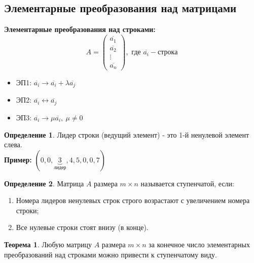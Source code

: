 \documentclass[a4paper, 12pt]{article}
\theoremstyle{definition}
\newtheorem*{definition}{Определение}
\newtheorem*{theorem}{Теорема}
\begin{document}
    \subsection{Элементарные преобразования над матрицами}
    \textbf{Элементарные преобразования над строками:} 
    $$A =\begin{pmatrix}
      \overline{a_1} \\
      \overline{a_2} \\
      \vdots \\
      \overline{a_n}
    \end{pmatrix}, \text{ где } \overline{a_i} - \text{строка}$$
    \begin{itemize}
      \item ЭП1: $\overline{a_i} \to \overline{a_i} + \lambda \overline{a_j}$
      \item ЭП2: $\overline{a_i} \longleftrightarrow   \overline{a_j}$
      \item ЭП3: $\overline{a_i} \to \mu \overline{a_i},\ \mu \neq 0$
  \end{itemize}
  \begin{definition}
    Лидер строки (ведущий элемент) - это 1-й ненулевой элемент слева. \\
    \textbf{Пример:} $(0, 0, \underbrace{3}_{\text{лидер}}, 4, 5, 0, 0, 7)$
  \end{definition}
  \begin{definition}
    Матрица $A$ размера $m\times n$ называется ступенчатой, если:
    \begin{enumerate}
      \item Номера лидеров ненулевых строк строго возрастают с увеличением номера строки;
      \item Все нулевые строки стоят внизу (в конце).
    \end{enumerate}
  \end{definition}
  \begin{theorem}
    Любую матрицу $A$ размера $m\times n$ за конечное число элементарных преобразований над строками можно привести к ступенчатому виду.
  \end{theorem}
\end{document}
